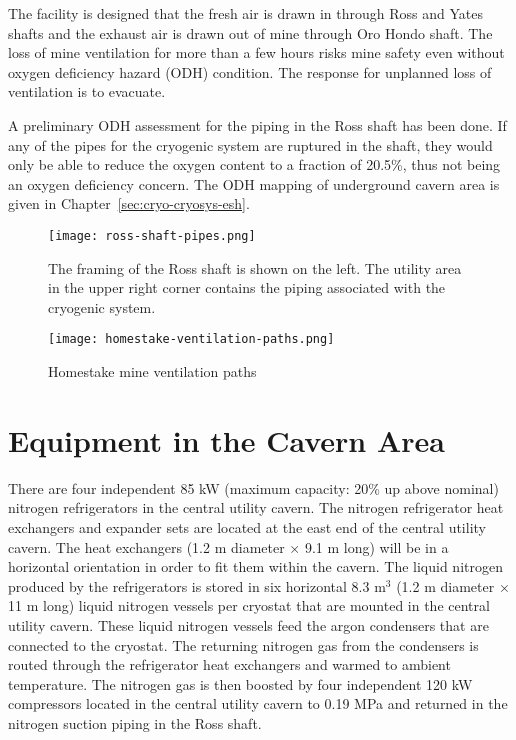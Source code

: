 The facility is designed that the fresh air is drawn
in through Ross and Yates shafts
and the exhaust
air is drawn out of mine through Oro Hondo shaft.
The loss of mine ventilation for more than a few hours risks mine safety
even without oxygen deficiency hazard (ODH) condition.
The response for unplanned loss of ventilation is to evacuate.

A preliminary ODH assessment for 
the piping in the Ross shaft has been done. If any of the pipes
for the cryogenic system are ruptured in the shaft, they would
only be able to reduce the oxygen content to a fraction of 20.5\%, 
thus not being an oxygen deficiency concern. The ODH mapping
of underground cavern area is given in Chapter~\ref{sec:cryo-cryosys-esh}.

\begin{figure}[htbp]
\centering
\texttt{[image: ross-shaft-pipes.png]} 
\caption{The framing of the Ross shaft is shown on the left. The utility area in the upper
right corner contains the piping
associated with the cryogenic system.}
\label{fig:framing-at-ross-piping}
\end{figure}

\begin{figure}[htbp]
\centering
\texttt{[image: homestake-ventilation-paths.png]} 
\caption{Homestake mine ventilation paths}
\label{fig:ventilation-paths}
\end{figure}

\chapter{Equipment in the Cavern Area}
\label{sec:cryo-cryosys-equip-cavern}

There are four independent 85 kW (maximum capacity: 20\% up above nominal) 
nitrogen refrigerators in the central utility cavern. The nitrogen
refrigerator heat exchangers and expander sets are located 
at the east end of the central utility cavern.
The heat exchangers (1.2 m diameter $\times$ 9.1 m long) 
will be in a horizontal orientation in order to
fit them within the cavern. The liquid nitrogen produced 
by the refrigerators is stored in six horizontal 
8.3 m$^3$ (1.2 m diameter $\times$ 11 m long) liquid 
nitrogen vessels per cryostat that are mounted in the
central utility cavern. These liquid nitrogen vessels
feed the argon condensers that are connected 
to the cryostat. The returning nitrogen gas from the 
condensers is routed through the refrigerator heat 
exchangers and warmed to ambient temperature. The 
nitrogen gas is then boosted by four independent 120 kW 
compressors located in the central utility cavern to 0.19 MPa 
and returned in the nitrogen suction piping 
in the Ross shaft.

